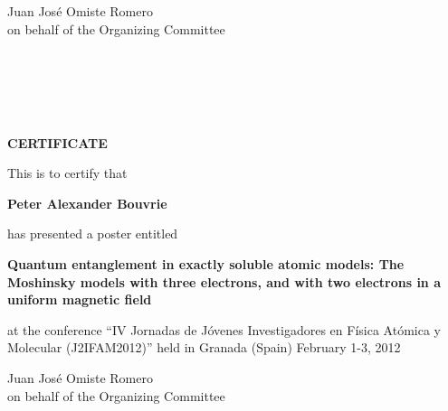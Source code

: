 \documentclass [13pt,a4paper] {letter}
\begin{document}
\vspace {3cm}
\begin{raggedleft}
Juan José Omiste Romero \\
on behalf of the Organizing Committee
\newpage
\end{raggedleft}
\begin{verbatim}





\end{verbatim}
\pagestyle{empty}
\begin{center}
{\bf {\Huge CERTIFICATE}}

\vspace {1.5cm}
This is to certify that
\vspace {1cm}

{\bf \Large  Peter  Alexander  Bouvrie }
\vspace {1cm}

has presented a poster entitled
\vspace {1cm}

{\bf \large  Quantum entanglement in exactly soluble atomic models: The Moshinsky models with three electrons, and with two electrons in a uniform magnetic field  }
\vspace {1cm}

at the conference { \textquotedblleft IV Jornadas de Jóvenes Investigadores en Física Atómica y Molecular (J2IFAM2012)\textquotedblright} 
held in Granada (Spain) February 1-3, 2012
\end{center}
\vspace {3cm}
\begin{raggedleft}
Juan José Omiste Romero \\
on behalf of the Organizing Committee
\newpage
\end{raggedleft}
\end{document}
